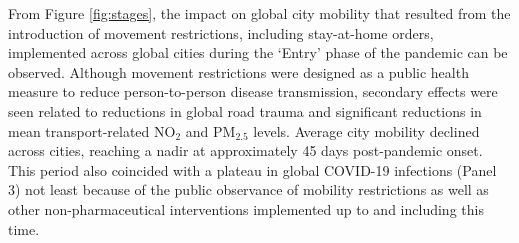 \documentclass[preprint,10pt]{elsarticle} %
\begin{document}
From Figure \ref{fig:stages}, the impact on global city mobility that resulted from the introduction of movement restrictions, including stay-at-home orders, implemented across global cities during the `Entry' phase\cite{hale2021global} of the pandemic can be observed. Although movement restrictions were designed as a public health measure to reduce person-to-person disease transmission, secondary effects were seen related to reductions in global road trauma \cite{ITFRS2023} and significant reductions in mean transport-related NO$_{2}$ and PM$_{2.5}$ levels\cite{zhang2023impact}. Average city mobility declined across cities, reaching a nadir at approximately 45 days post-pandemic onset. This period also coincided with a plateau in global COVID-19 infections (Panel 3) not least because of the public observance of mobility restrictions as well as other non-pharmaceutical interventions implemented up to and including this time\cite{hale2021global}. 
\end{document}
